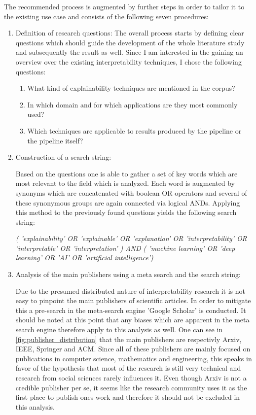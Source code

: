 The recommended process is augmented by further steps in order to tailor it to the existing use case and consists of the following seven procedures:
\begin{enumerate}
	
	\item Definition of research questions:
	The overall process starts by defining clear questions which should guide the development of the whole literature study and subsequently the result as well. Since I am interested in the gaining an overview over the existing interpretability techniques, I chose the following questions:
	
	\begin{enumerate}
		\item What kind of explainability techniques are mentioned in the corpus?
		\item In which domain and for which applications are they most commonly used?
		\item Which techniques are applicable to results produced by the pipeline or the pipeline itself? 
	\end{enumerate}
	
	\item Construction of a search string:
	
	Based on the questions one is able to gather a set of key words which are most relevant to the field which is analyzed. Each word is augmented by synonyms which are concatenated with boolean OR operators and several of these synonymous groups are again connected via logical ANDs. Applying this method to the previously found questions yields the following search string:
	
	\textit{( 'explainability' OR 'explainable' OR 'explanation' OR 'interpretability' OR 'interpretable' OR 'interpretation' ) AND ( 'machine learning' OR 'deep learning' OR 'AI' OR 'artificial intelligence')}
	
	
	\item Analysis of the main publishers using a meta search and the search string:
	
	Due to the presumed distributed nature of interpretability research it is not easy to pinpoint the main publishers of scientific articles. In order to mitigate this a pre-search in the meta-search engine 'Google Scholar' is conducted. It should be noted at this point that any biases which are apparent in the meta search engine therefore apply to this analysis as well. One can see in \autoref{fig:publisher_distribution} that the main publishers are respectivly Arxiv, IEEE, Springer and ACM. Since all of these publishers are mainly focused on publications in computer science, mathematics and engineering, this speaks in favor of the hypothesis that most of the research is still very technical and research from social sciences rarely influences it. Even though Arxiv is not a credible publisher per se, it seems like the research community uses it as the first place to publish ones work and therefore it should not be excluded in this analysis. 
	

\end{enumerate}
